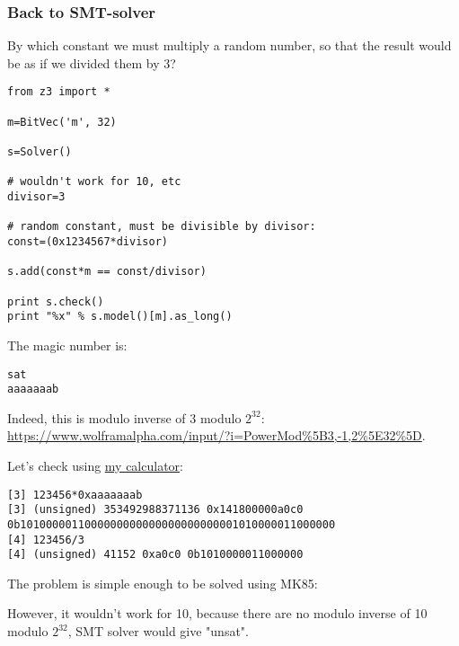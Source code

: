 \subsubsection{Back to SMT-solver}

By which constant we must multiply a random number, so that the result would be as if we divided them by 3?

\begin{lstlisting}
from z3 import *

m=BitVec('m', 32)

s=Solver()

# wouldn't work for 10, etc
divisor=3

# random constant, must be divisible by divisor:
const=(0x1234567*divisor)

s.add(const*m == const/divisor)

print s.check()
print "%x" % s.model()[m].as_long()
\end{lstlisting}

The magic number is:

\begin{lstlisting}
sat
aaaaaaab
\end{lstlisting}

Indeed, this is modulo inverse of 3 modulo $2^{32}$: \url{https://www.wolframalpha.com/input/?i=PowerMod%5B3,-1,2%5E32%5D}.

Let's check using \href{https://github.com/DennisYurichev/progcalc}{my calculator}:

\begin{lstlisting}
[3] 123456*0xaaaaaaab
[3] (unsigned) 353492988371136 0x141800000a0c0 0b1010000011000000000000000000000001010000011000000
[4] 123456/3
[4] (unsigned) 41152 0xa0c0 0b1010000011000000
\end{lstlisting}

The problem is simple enough to be solved using MK85:





However, it wouldn't work for 10, because there are no modulo inverse of 10 modulo $2^{32}$, SMT solver would give "unsat".


